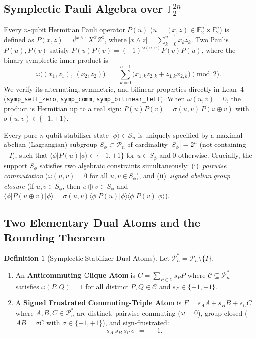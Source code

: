 \documentclass[11pt,a4paper]{article}
\theoremstyle{definition}
\newtheorem{definition}[theorem]{Definition}
\theoremstyle{remark}
\newcommand{\F}{\mathbb{F}}
\newcommand{\Pauli}{\mathcal{P}}
\newcommand{\Code}[1]{{\small\texttt{#1}}}
\begin{document}
\subsection{Symplectic Pauli Algebra over \texorpdfstring{$\F_2^{2n}$}{F2\textasciicircum(2n)}}
Every $n$-qubit Hermitian Pauli operator $P(u)$ ($u = (x, z) \in \F_2^n \times \F_2^n$) is defined as $P(x, z) = i^{|x \wedge z|} X^x Z^z$, where $|x \wedge z| = \sum_{k=0}^{n-1} x_k z_k$. Two Paulis $P(u), P(v)$ satisfy $P(u)P(v) = (-1)^{\omega(u, v)} P(v)P(u)$, where the binary symplectic inner product is
\begin{equation}
  \omega\bigl((x_1, z_1),\, (x_2, z_2)\bigr) \;=\; \sum_{k=0}^{n-1} \bigl(x_{1,k} z_{2,k} + z_{1,k} x_{2,k}\bigr) \pmod 2.
  \label{eq:symp}
\end{equation}
We verify its alternating, symmetric, and bilinear properties directly in Lean~4 (\Code{symp\_self\_zero}, \Code{symp\_comm}, \Code{symp\_bilinear\_left}). When $\omega(u, v) = 0$, the product is Hermitian up to a real sign: $P(u) P(v) = \sigma(u, v)\, P(u \oplus v)$ with $\sigma(u, v) \in \{-1, +1\}$.

Every pure $n$-qubit stabilizer state $|\phi\rangle \in \mathcal{S}_n$ is uniquely specified by a maximal abelian (Lagrangian) subgroup $S_\phi \subset \Pauli_n$ of cardinality $|S_\phi| = 2^n$ (not containing $-I$), such that $\langle\phi|P(u)|\phi\rangle \in \{-1, +1\}$ for $u \in S_\phi$ and $0$ otherwise. Crucially, the support $S_\phi$ satisfies two algebraic constraints simultaneously: (i)~\emph{pairwise commutation} ($\omega(u, v) = 0$ for all $u, v \in S_\phi$), and (ii)~\emph{signed abelian group closure} (if $u, v \in S_\phi$, then $u \oplus v \in S_\phi$ and $\langle\phi|P(u\oplus v)|\phi\rangle = \sigma(u, v)\langle\phi|P(u)|\phi\rangle\langle\phi|P(v)|\phi\rangle$).

\subsection{Two Elementary Dual Atoms and the Rounding Theorem}
\begin{definition}[Symplectic Stabilizer Dual Atoms]
\label{def:atoms}
Let $\Pauli_n^* = \Pauli_n \setminus \{I\}$.
\begin{enumerate}[label=(\alph*),leftmargin=1.8em,itemsep=2pt]
  \item An \textbf{Anticommuting Clique Atom} is $C = \sum_{P \in \mathcal{C}} s_P P$ where $\mathcal{C} \subseteq \Pauli_n^*$ satisfies $\omega(P, Q) = 1$ for all distinct $P, Q \in \mathcal{C}$ and $s_P \in \{-1, +1\}$.
  \item A \textbf{Signed Frustrated Commuting-Triple Atom} is $F = s_A A + s_B B + s_C C$ where $A, B, C \in \Pauli_n^*$ are distinct, pairwise commuting ($\omega = 0$), group-closed ($A B = \sigma C$ with $\sigma \in \{-1, +1\}$), and sign-frustrated:
  \begin{equation}
    s_A\, s_B\, s_C\, \sigma \;=\; -1.
    \label{eq:frust-cond}
  \end{equation}
\end{enumerate}
\end{definition}
\end{document}
